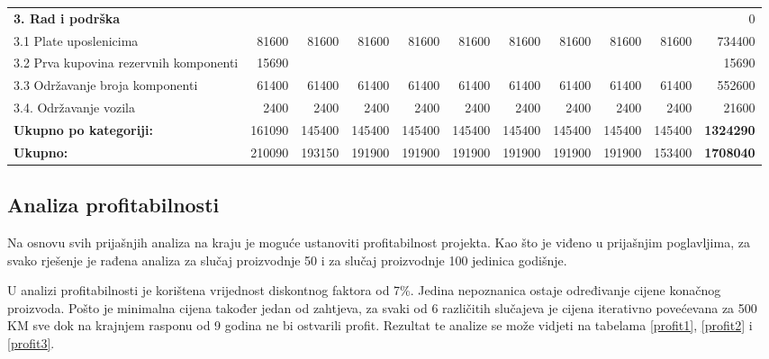 \documentclass[12pt]{article}
\begin{document}
\begin{landscape}
\begin{table}[htbp]
\begin{tabular}{lrrrrrrrrrr}
    \midrule
    \textbf{3. Rad i podrška} &       &       &       &       &       &       &       &       &       & 0 \\
    3.1 Plate uposlenicima & 81600 & 81600 & 81600 & 81600 & 81600 & 81600 & 81600 & 81600 & 81600 & 734400 \\
    \multicolumn{1}{p{14.715em}}{3.2 Prva kupovina rezervnih\newline{} komponenti} & 15690 &       &       &       &       &       &       &       &       & 15690 \\
    3.3 Održavanje broja komponenti & 61400 & 61400 & 61400 & 61400 & 61400 & 61400 & 61400 & 61400 & 61400 & 552600 \\
    3.4. Održavanje vozila & 2400  & 2400  & 2400  & 2400  & 2400  & 2400  & 2400  & 2400  & 2400  & 21600 \\
    \midrule
    \textbf{Ukupno po kategoriji:} & 161090 & 145400 & 145400 & 145400 & 145400 & 145400 & 145400 & 145400 & 145400 & \textbf{1324290} \\
    \midrule
    \textbf{Ukupno:} & 210090 & 193150 & 191900 & 191900 & 191900 & 191900 & 191900 & 191900 & 153400 & \textbf{1708040} \\

    \bottomrule
    \end{tabular}%
  \label{rj3_100}%
\end{table}%
\end{landscape}

\subsection{Analiza profitabilnosti}
Na osnovu svih prijašnjih analiza na kraju je moguće ustanoviti profitabilnost projekta. Kao što je viđeno u prijašnjim poglavljima, za svako rješenje je rađena analiza za slučaj proizvodnje 50 i za slučaj proizvodnje 100 jedinica godišnje. 

U analizi profitabilnosti je korištena vrijednost diskontnog faktora od 7\%. Jedina nepoznanica ostaje određivanje cijene konačnog proizvoda. Pošto je minimalna cijena također jedan od zahtjeva, za svaki od 6 različitih slučajeva je cijena iterativno povećevana za 500 KM sve dok na krajnjem rasponu od 9 godina ne bi ostvarili profit. Rezultat te analize se može vidjeti na tabelama \ref{profit1}, \ref{profit2} i \ref{profit3}.
\end{document}

